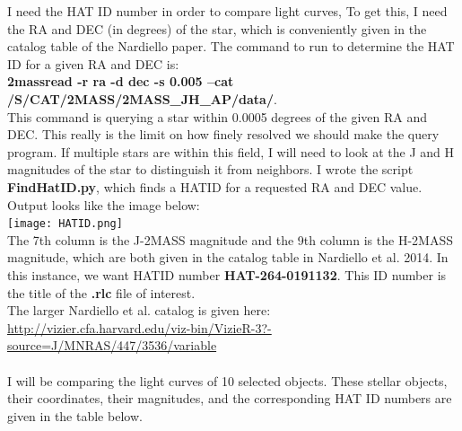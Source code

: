 I need the HAT ID number in order to compare light curves, To get this, I need the RA and DEC (in degrees) of the star, which is conveniently given in the catalog table of the Nardiello paper.
The command to run to determine the HAT ID for a given RA and DEC is: \\ 
\textbf{2massread -r ra -d dec -s 0.005 --cat /S/CAT/2MASS/2MASS\_JH\_AP/data/}.\\
This command is querying a star within 0.0005 degrees of the given RA and DEC. This really is the limit on how finely resolved we should make the query program. If multiple stars are within this field, I will need to look at the J and H magnitudes of the star to distinguish it from neighbors. 
I wrote the script \textbf{FindHatID.py}, which finds a HATID for a requested RA and DEC value. 
Output looks like the image below: \\
\texttt{[image: HATID.png]}\\
The 7th column is the J-2MASS magnitude and the 9th column is the H-2MASS magnitude, which are both given in the catalog table in Nardiello et al. 2014. In this instance, we want HATID number \textbf{HAT-264-0191132}. This ID number is the title of the \textbf{.rlc} file of interest.\\
The larger Nardiello et al. catalog is given here:\\
\url{http://vizier.cfa.harvard.edu/viz-bin/VizieR-3?-source=J/MNRAS/447/3536/variable}\\ \\ 
I will be comparing the light curves of 10 selected objects. These stellar objects, their coordinates, their magnitudes, and the corresponding HAT ID numbers are given in the table below.


